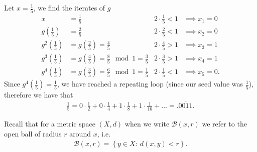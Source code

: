 \begin{ex}
	Let $x=\frac{1}{5}$, we find the iterates of $g$ 
	\begin{subequations}
	\begin{align}
		x &= \frac{1}{5} & 2\cdot \frac{1}{5}<1 & \implies x_1 = 0\\
		g\left(\frac{1}{5}\right) &= \frac{2}{5} & 2 \cdot \frac{2}{5}<1 &\implies x_2 = 0 \\
		g^{2}\left(\frac{1}{5}\right) &= g\left(\frac{2}{5}\right) = \frac{4}{5} & 2\cdot \frac{4}{5} > 1 &\implies x_3 = 1 \\
		g^{3}\left(\frac{1}{5}\right) &= g\left(\frac{4}{5}\right) = \frac{8}{5} \mod 1 = \frac{3}{5}& 2\cdot \frac{3}{5} > 1	  &\implies x_4 = 1 \\
		g^{4}\left(\frac{1}{5}\right) &= g\left(\frac{3}{5}\right) = \frac{6}{5} \mod 1 = \frac{1}{5}& 2\cdot \frac{1}{5} < 1	  &\implies x_5 = 0. 
	\end{align}
\end{subequations}
	Since $g^{4}\left(\frac{1}{5}\right) = \frac{1}{5}$, we have reached a repeating loop (since our seed value was $\frac{1}{5}$), therefore we have that
	\begin{align}
		\frac{1}{5} = 0\cdot \frac{1}{2} + 0\cdot \frac{1}{4} + 1\cdot \frac{1}{8} + 1\cdot \frac{1}{16} + \ldots = \bm{.} \overline{0011}. 
	\end{align}
	
\end{ex}

\begin{remark}[]
	Recall that for a metric space $(X,d)$ when we write $\mathcal{B}\left(x, r\right) $ we refer to the open ball of radius $r $ around $x $, i.e.
	\begin{align}
		\mathcal{B}\left(x,r\right) = \left\{ y\in X:\ d(x,y) < r \right\}.
	\end{align}
\end{remark}

